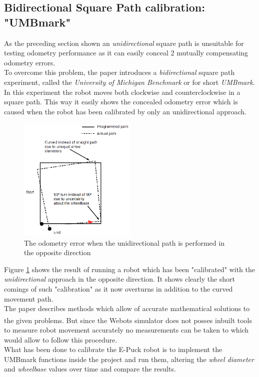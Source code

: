 \subsection{Bidirectional Square Path calibration: "UMBmark"}
As the preceding section shown an \textit{unidirectional} square path is unsuitable for testing odometry performance as it can easily conceal 2 mutually compensating odometry errors.\\
To overcome this problem, the paper introduces a \textit{bidirectional} square path experiment, called the \textit{University of Michigan Benchmark} or for short \textit{UMBmark}.
In this experiment the robot moves both clockwise and counterclockwise in a square path. This way it easily shows the concealed odometry error which is caused when the robot has been calibrated by only an unidirectional approach.\\

\begin{figure}[h]
\centering
\includegraphics[width = 0.5\textwidth]{../../figures/unidirectional_error}
\caption{The odometry error when the unidirectional path is performed in the opposite direction}
\label{unidirectional_error}
\end{figure}

Figure \ref{unidirectional_error} shows the result of running a robot which has been "calibrated" with the \textit{unidirectional} approach in the opposite direction. It shows clearly the short comings of such "calibration" as it now overturns in addition to the curved movement path.\\[3ex]

The paper describes methods which allow of accurate mathematical solutions to the given problems. But since the  Webots\textsuperscript{\texttrademark} simulator does not posses inbuilt tools to measure robot movement accurately no measurements can be taken to which would allow to follow this procedure.\\
What has been done to calibrate the E-Puck robot is to implement the UMBmark functions inside the project and run them, altering the \textit{wheel diameter} and \textit{wheelbase} values over time and compare the results.\\


